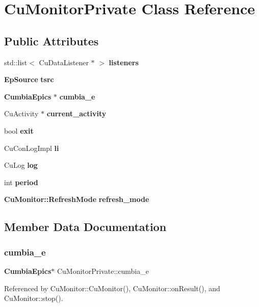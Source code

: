 \section{Cu\+Monitor\+Private Class Reference}
\label{classCuMonitorPrivate}
\subsection*{Public Attributes}
\begin{DoxyCompactItemize}
\item 
std\+::list$<$ Cu\+Data\+Listener $\ast$ $>$ \textbf{ listeners}
\item 
\textbf{ Ep\+Source} \textbf{ tsrc}
\item 
\textbf{ Cumbia\+Epics} $\ast$ \textbf{ cumbia\+\_\+e}
\item 
Cu\+Activity $\ast$ \textbf{ current\+\_\+activity}
\item 
bool \textbf{ exit}
\item 
Cu\+Con\+Log\+Impl \textbf{ li}
\item 
Cu\+Log \textbf{ log}
\item 
int \textbf{ period}
\item 
\textbf{ Cu\+Monitor\+::\+Refresh\+Mode} \textbf{ refresh\+\_\+mode}
\end{DoxyCompactItemize}


\subsection{Member Data Documentation}
\mbox{\label{classCuMonitorPrivate_a246616adf3f6d59bc9d9f017aa3a7dec}} 
\subsubsection{cumbia\+\_\+e}
{\footnotesize\ttfamily \textbf{ Cumbia\+Epics}$\ast$ Cu\+Monitor\+Private\+::cumbia\+\_\+e}



Referenced by Cu\+Monitor\+::\+Cu\+Monitor(), Cu\+Monitor\+::on\+Result(), and Cu\+Monitor\+::stop().

\mbox{\label{classCuMonitorPrivate_a8fffc9675988d2e5abab9111c0d486f1}} 

